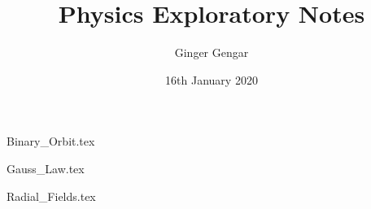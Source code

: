 \documentclass[a4paper, 12pt]{report}
\begin{document}
\title{Physics Exploratory Notes}
\author{Ginger Gengar}
\date{16th January 2020}
\maketitle
\newpage

\tableofcontents

\begin{center}
{Binary_Orbit.tex}
\begin{comment}
Start Level: chapter
End Level: chapter
Aditional Comments:
\end{comment}
{Gauss_Law.tex}
\begin{comment}
Start Level: chapter
End Level: chapter
Aditional Comments:
\end{comment}
{Radial_Fields.tex}
\begin{comment}
Start Level: chapter
End Level: chapter
Aditional Comments:
\end{comment}

\end{center}
\end{document}
